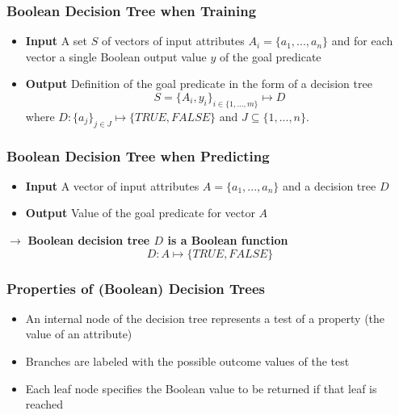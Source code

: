 \documentclass[conference, a4paper]{styles/acmsiggraph}
\begin{document}
        \subsubsection{Boolean Decision Tree when Training}
            \begin{itemize}
                \item \textbf{Input}\newline
                A set $S$ of vectors of input attributes $A_i = \{a_1,...,a_n\}$ and for each vector a single Boolean output value $y$ of the goal predicate
                \item \textbf{Output}\newline
                Definition of the goal predicate in the form of a decision tree
                $$S = \{A_i,y_i\}_{i \in \{1,...,m\}} \mapsto D$$
                where $D: \{a_j\}_{j \in J} \mapsto \{TRUE,FALSE\}$ and $J \subseteq \{1,...,n\}$.
            \end{itemize}
        
        \subsubsection{Boolean Decision Tree when Predicting}
            \begin{itemize}
                \item \textbf{Input}\newline
                A vector of input attributes $A = \{a_1,...,a_n\}$ and a decision tree $D$
                \item \textbf{Output}\newline
                Value of the goal predicate for vector $A$
            \end{itemize}
            $\rightarrow$ \textbf{Boolean decision tree $D$ is a Boolean function}
            $$D: A \mapsto \{TRUE,FALSE\}$$
        
        \subsubsection{Properties of (Boolean) Decision Trees}
            \begin{itemize}
                \item An internal node of the decision tree represents a test of a property (the value of an attribute)
                \item Branches are labeled with the possible outcome values of the test
                \item Each leaf node specifies the Boolean value to be returned if that leaf is reached
            \end{itemize}
\end{document}
